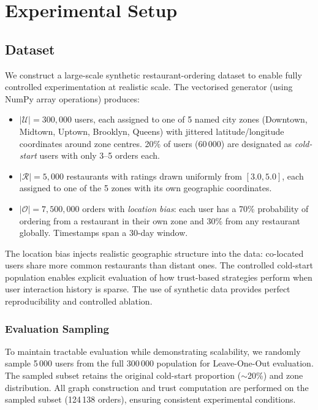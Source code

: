 \documentclass[conference]{IEEEtran}
\begin{document}
\section{Experimental Setup}
\label{sec:setup}

\subsection{Dataset}
We construct a large-scale synthetic restaurant-ordering dataset to
enable fully controlled experimentation at realistic scale.  The
vectorised generator (using NumPy array operations) produces:
\begin{itemize}
  \item $|\mathcal{U}| = 300{,}000$ users, each assigned to one of 5
        named city zones (Downtown, Midtown, Uptown, Brooklyn, Queens)
        with jittered latitude/longitude coordinates around zone centres.
        20\% of users (60\,000) are designated as \emph{cold-start}
        users with only 3--5 orders each.
  \item $|\mathcal{R}| = 5{,}000$ restaurants with ratings drawn
        uniformly from $[3.0, 5.0]$, each assigned to one of the 5 zones
        with its own geographic coordinates.
  \item $|\mathcal{O}| = 7{,}500{,}000$ orders with \emph{location
        bias}: each user has a 70\% probability of ordering from a
        restaurant in their own zone and 30\% from any restaurant
        globally.  Timestamps span a 30-day window.
\end{itemize}
The location bias injects realistic geographic structure into the
data: co-located users share more common restaurants than distant ones.
The controlled cold-start population enables explicit evaluation of how
trust-based strategies perform when user interaction history is sparse.
The use of synthetic data provides perfect reproducibility and
controlled ablation.

\subsubsection{Evaluation Sampling}
To maintain tractable evaluation while demonstrating scalability, we
randomly sample 5\,000 users from the full 300\,000 population for
Leave-One-Out evaluation.  The sampled subset retains the original
cold-start proportion ($\sim$20\%) and zone distribution.  All graph
construction and trust computation are performed on the sampled
subset (124\,138 orders), ensuring consistent experimental conditions.
\end{document}
